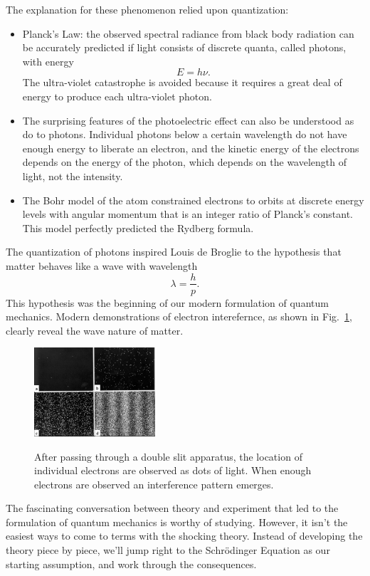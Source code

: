 \documentclass[12pt]{book}
\begin{document}
The explanation for these phenomenon relied upon quantization: 
\begin{itemize}
\item Planck's Law: the observed spectral radiance from black body radiation can be accurately predicted if light consists of discrete quanta, called photons, with energy 
$$E = h \nu.$$  
The ultra-violet catastrophe is avoided because it requires a great deal of energy to produce each ultra-violet photon.   
\item The surprising features of the photoelectric effect can also be understood as do to photons.  Individual photons below a certain wavelength do not have enough energy to liberate an electron, and the kinetic energy of the electrons depends on the energy of the photon, which depends on the wavelength of light, not the intensity. 
\item The Bohr model of the atom constrained electrons to orbits at discrete energy levels with angular momentum that is an integer ratio of Planck's constant.  This model perfectly predicted the Rydberg formula.
\end{itemize}

The quantization of photons inspired Louis de Broglie to the hypothesis that matter behaves like a wave with wavelength
$$ \lambda = \frac{h}{p}.$$
This hypothesis was the beginning of our modern formulation of quantum mechanics.  Modern demonstrations of electron interefernce, as shown in Fig.~\ref{fig:elecint}, clearly reveal the wave nature of matter.

\begin{figure}[thb]
\begin{center}
{\includegraphics[width=0.40\textwidth]{figs/electron_interference.jpg}}
\end{center}
\caption{\label{fig:elecint} After passing through a double slit apparatus, the location of individual electrons are observed as dots of light.  When enough electrons are observed an interference pattern emerges.}
\end{figure}

The fascinating conversation between theory and experiment that led to the formulation of quantum mechanics is worthy of studying.  However, it isn't the easiest ways to come to terms with the shocking theory.  Instead of developing the theory piece by piece, we'll jump right to the Schr\"odinger Equation as our starting assumption, and work through the consequences.
\end{document}
